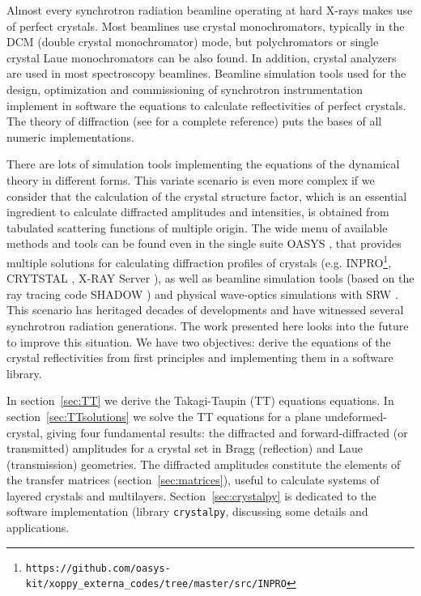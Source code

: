 \documentclass{iucr}
\newcommand{\cyan}[1]{{\color{cyan(process)}#1}}
\begin{document}
\cyan{
Almost every synchrotron radiation beamline operating at hard X-rays makes use of perfect crystals.  
Most beamlines use crystal monochromators, typically in the DCM (double crystal monochromator) mode, but polychromators or single crystal Laue monochromators can be also found. In addition, crystal analyzers are used in most spectroscopy beamlines. 
Beamline simulation tools used for the design, optimization and commissioning of synchrotron instrumentation implement in software the equations to calculate reflectivities of perfect crystals. The theory of diffraction (see \cite{authierbook} for a complete reference) puts the bases of all numeric implementations. 

There are lots of simulation tools implementing the equations of the dynamical theory in different forms. This variate scenario is even more complex if we consider that the calculation of the crystal structure factor, which is an essential ingredient to calculate diffracted amplitudes and intensities, is obtained from tabulated scattering functions of multiple origin. The wide menu of available methods and tools can be found even in the single suite OASYS \cite{codeOASYS}, that provides multiple solutions for calculating diffraction profiles of crystals (e.g. INPRO\footnote{\texttt{https://github.com/oasys-kit/xoppy\_externa\_codes/tree/master/src/INPRO}}, CRYTSTAL \cite{codeCRYSTAL}, X-RAY Server \cite{codeXRAYserver}), as well as beamline simulation tools (based on the ray tracing code SHADOW \cite{codeSHADOW}) and physical wave-optics simulations with SRW \cite{codeSRW, codeSRWcrystals}. This scenario has heritaged decades of developments and have witnessed several synchrotron radiation generations. The work presented here looks into the future to improve this situation. We have two objectives: derive the equations of the crystal reflectivities from first principles and implementing them in a software library.

In section~\ref{sec:TT} we derive the Takagi-Taupin (TT) equations \cite{Takagi1962, Taupin, Taupin1967} equations. In section~\ref{sec:TTsolutions} we solve the TT equations for a plane undeformed-crystal, giving four fundamental results: the diffracted and forward-diffracted (or transmitted) amplitudes for a crystal set in Bragg (reflection) and Laue (transmission) geometries. The diffracted amplitudes constitute the elements of the transfer matrices (section~\ref{sec:matrices}), useful to calculate systems of layered crystals and multilayers. Section~\ref{sec:crystalpy} is dedicated to the software implementation (library \texttt{crystalpy}, discussing some details and applications.
 }
 
\end{document}
